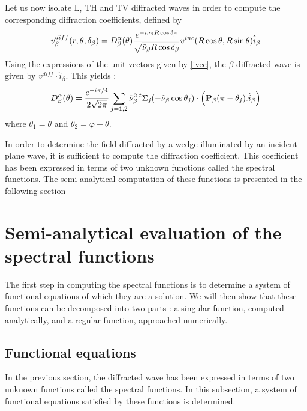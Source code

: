 Let us now isolate L, TH and TV diffracted waves in order to compute the corresponding diffraction coefficients, defined by
\begin{equation}
v_{\beta}^{diff}(r,\theta,\delta_{\beta})=D_{\beta}^{\alpha}(\theta)\frac{e^{-i\tilde{\nu}_{\beta}R\cos\delta_{\beta}}}{\sqrt{\tilde{\nu}_{\beta}R\cos\delta_{\beta}}} v^{inc}(R\cos\theta,R\sin\theta) \hat{i}_{\beta}
\label{C4:coeffdiff}
\end{equation}
Using the expressions of the unit vectors given by \eqref{ivec}, the $\beta$ diffracted wave is given by $v^{diff}\cdot \hat{i}_{\beta}$. This yields :
\begin{equation}
D_{\beta}^{\alpha}(\theta)=\frac{e^{-i\pi/4}}{2\sqrt{2\pi}}\sum_{j=1,2}\tilde{\nu}_{\beta}^2 \,{}^t \Sigma_j(-\tilde{\nu}_{\beta}\cos\theta_j)\cdot\left(\mathbf{P}_{\beta}(\pi-\theta_j).\hat{i}_{\beta}\right)
\label{C4:Dbeta}
\end{equation}
where $\theta_1=\theta$ and $\theta_2=\varphi-\theta$.

In order to determine the field diffracted by a wedge illuminated by an incident plane wave, it is sufficient to compute the diffraction coefficient. This coefficient has been expressed in terms of two unknown functions called the spectral functions. The semi-analytical computation of these functions is presented in the following section

\section{Semi-analytical evaluation of the spectral functions}
The first step in computing the spectral functions is to determine a system of functional equations of which they are a solution. We will then show that these functions can be decomposed into two parts : a singular function, computed analytically, and a regular function, approached numerically.
\subsection{Functional equations}
In the previous section, the diffracted wave has been expressed in terms of two unknown functions called the spectral functions. In this subsection, a system of functional equations satisfied by these functions is determined. 

